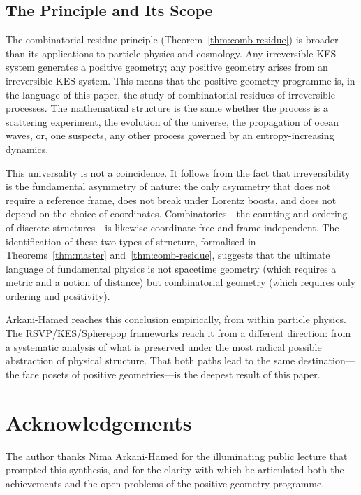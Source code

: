 \documentclass[12pt, oneside]{amsart}
\theoremstyle{plain}
\theoremstyle{definition}
\theoremstyle{remark}
\begin{document}
\subsection{The Principle and Its Scope}

The combinatorial residue principle (Theorem~\ref{thm:comb-residue}) is broader than its applications to particle physics and cosmology. Any irreversible KES system generates a positive geometry; any positive geometry arises from an irreversible KES system. This means that the positive geometry programme is, in the language of this paper, the study of combinatorial residues of irreversible processes. The mathematical structure is the same whether the process is a scattering experiment, the evolution of the universe, the propagation of ocean waves, or, one suspects, any other process governed by an entropy-increasing dynamics.

This universality is not a coincidence. It follows from the fact that irreversibility is the fundamental asymmetry of nature: the only asymmetry that does not require a reference frame, does not break under Lorentz boosts, and does not depend on the choice of coordinates. Combinatorics---the counting and ordering of discrete structures---is likewise coordinate-free and frame-independent. The identification of these two types of structure, formalised in Theorems~\ref{thm:master} and~\ref{thm:comb-residue}, suggests that the ultimate language of fundamental physics is not spacetime geometry (which requires a metric and a notion of distance) but combinatorial geometry (which requires only ordering and positivity).

Arkani-Hamed reaches this conclusion empirically, from within particle physics. The RSVP/KES/Spherepop frameworks reach it from a different direction: from a systematic analysis of what is preserved under the most radical possible abstraction of physical structure. That both paths lead to the same destination---the face posets of positive geometries---is the deepest result of this paper.

\section*{Acknowledgements}

The author thanks Nima Arkani-Hamed for the illuminating public lecture that prompted this synthesis, and for the clarity with which he articulated both the achievements and the open problems of the positive geometry programme.
\end{document}
